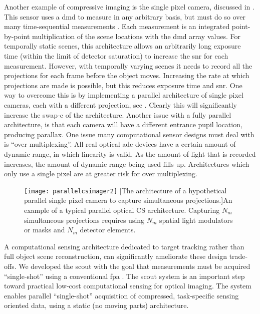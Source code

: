 Another example of \gls{compressive imaging} is the single pixel camera, discussed in . This sensor uses a \acrfull{dmd} to measure in any arbitrary basis, but must do so over many time-sequential measurements \cite{duarte2008single}. Each measurement is an integrated point-by-point multiplication of the scene locations with the \gls{dmd} array values. For temporally static scenes, this architecture allows an arbitrarily long exposure time (within the limit of detector saturation) to increase the \gls{snr} for each measurement. However, with temporally varying scenes it needs to record all the projections for each frame before the object moves.  Increasing the rate at which projections are made is possible, but this reduces exposure time and \gls{snr}. One way to overcome this is by implementing a parallel architecture of single pixel cameras, each with a different projection, see . Clearly this will significantly increase the \gls{swap-c} of the architecture. Another issue with a fully parallel architecture, is that each camera will have a different entrance pupil location, producing parallax. One issue many computational sensor designs must deal with is ``over multiplexing''. All real optical \gls{adc} devices have a certain amount of dynamic range, in which linearity is valid. As the amount of light that is recorded increases, the amount of dynamic range being used fills up. Architectures which only use a single pixel are at greater risk for over multiplexing. 

\begin{figure}
	\texttt{[image: parallelcsimager2]}
	[The architecture of a hypothetical parallel single pixel camera to capture simultaneous projections.]{An example of a typical parallel optical CS architecture. Capturing $N_m$ simultaneous projections requires using $N_m$ spatial light modulators or masks and $N_m$ detector elements.}
	\label{fig:parallelcsimager2}
\end{figure}

A computational sensing architecture dedicated to target tracking rather than full object scene reconstruction, can significantly ameliorate these design trade-offs. We developed the \acrfull{scout} with the goal that measurements must be acquired ``single-shot'' using a conventional \gls{fpa} \cite{townsend2012static, poon2012advances}. The \gls{scout} system is an important step toward practical low-cost computational sensing for optical imaging. The system enables parallel ``single-shot'' acquisition of compressed, task-specific sensing oriented data, using a static (no moving parts) architecture. 

